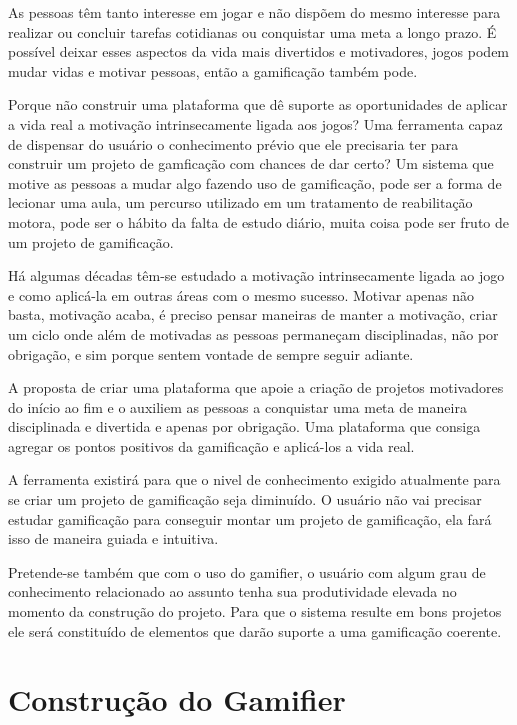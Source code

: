 As pessoas têm tanto interesse em jogar e não dispõem do mesmo interesse para realizar ou concluir tarefas cotidianas ou conquistar uma meta a longo prazo. É possível deixar esses aspectos da vida mais divertidos e motivadores, jogos podem mudar vidas e motivar pessoas, então a gamificação também pode.

Porque não construir uma plataforma que dê suporte as oportunidades de aplicar a vida real a motivação intrinsecamente ligada aos jogos? Uma ferramenta capaz de dispensar do usuário o conhecimento prévio que ele precisaria ter para construir um projeto de gamficação com chances de dar certo? Um sistema que motive as pessoas a mudar algo fazendo uso de gamificação, pode ser a forma de lecionar uma aula, um percurso utilizado em um tratamento de reabilitação motora, pode ser o hábito da falta de estudo diário, muita coisa pode ser fruto de um projeto de gamificação.

Há algumas décadas têm-se estudado a motivação intrinsecamente ligada ao jogo e como aplicá-la em outras áreas com o mesmo sucesso. Motivar apenas não basta, motivação acaba, é preciso pensar maneiras de manter a motivação, criar um ciclo onde além de motivadas as pessoas permaneçam disciplinadas, não por obrigação, e sim porque sentem vontade de sempre seguir adiante. 

A proposta de criar uma plataforma que apoie a criação de projetos motivadores do início ao fim e o auxiliem as pessoas a conquistar uma meta de maneira disciplinada e divertida e apenas por  obrigação. Uma plataforma que consiga agregar os pontos positivos da gamificação e aplicá-los a vida real.

A ferramenta existirá para que o nivel de conhecimento exigido atualmente para se criar um projeto de gamificação seja diminuído. O usuário não vai precisar estudar gamificação para conseguir montar um projeto de gamificação, ela fará isso de maneira guiada e intuitiva.

Pretende-se também que com o uso do gamifier, o usuário com algum grau de conhecimento relacionado ao assunto tenha sua produtividade elevada no momento da construção do projeto. Para que o sistema resulte em bons projetos ele será constituído de elementos que darão suporte a uma gamificação coerente.

\section{Construção do Gamifier}

